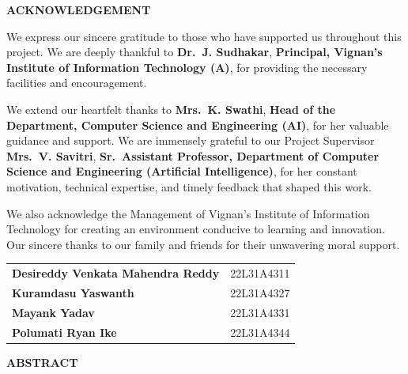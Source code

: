 \documentclass[12pt,a4paper]{report}
\begin{document}
\clearpage
\thispagestyle{frontmatterstyle}

\begin{center}
{\LARGE\bfseries ACKNOWLEDGEMENT}
\end{center}
\vspace{0.8cm}

We express our sincere gratitude to those who have supported us throughout this project. We are deeply thankful to \textbf{Dr.\ J. Sudhakar}, \textbf{Principal, Vignan's Institute of Information Technology (A)}, for providing the necessary facilities and encouragement.

We extend our heartfelt thanks to \textbf{Mrs.\ K. Swathi}, \textbf{Head of the Department, Computer Science and Engineering (AI)}, for her valuable guidance and support. We are immensely grateful to our Project Supervisor \textbf{Mrs.\ V. Savitri}, \textbf{Sr.\ Assistant Professor, Department of Computer Science and Engineering (Artificial Intelligence)}, for her constant motivation, technical expertise, and timely feedback that shaped this work.

We also acknowledge the Management of Vignan's Institute of Information Technology for creating an environment conducive to learning and innovation. Our sincere thanks to our family and friends for their unwavering moral support.

\vspace{1.5cm}
\noindent
\begin{center}
\begin{tabular}{ll}
\textbf{Desireddy Venkata Mahendra Reddy} & 22L31A4311 \\[0.5cm]
\textbf{Kuramdasu Yaswanth} & 22L31A4327 \\[0.5cm]
\textbf{Mayank Yadav} & 22L31A4331 \\[0.5cm]
\textbf{Polumati Ryan Ike} & 22L31A4344 \\
\end{tabular}
\end{center}

\clearpage
\thispagestyle{frontmatterstyle}

\begin{center}
{\LARGE\bfseries ABSTRACT}
\end{center}
\vspace{0.8cm}
\end{document}
